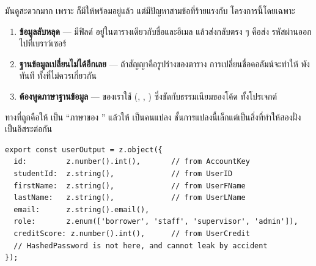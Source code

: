 \begin{badbox}[title={ห้าม \code{return} \en{Prisma model} ตรง ๆ ออกไปเป็น \en{output}}]
มันดูสะดวกมาก เพราะ  ก็มีให้พร้อมอยู่แล้ว แต่มีปัญหาสามข้อที่ร้ายแรงกับ
โครงการนี้โดยเฉพาะ

\begin{enumerate}
\item \textbf{ข้อมูลลับหลุด} ---  มีฟิลด์
       อยู่ในตารางเดียวกับชื่อและอีเมล 
      แล้วส่งกลับตรง ๆ คือส่ง  รหัสผ่านออกไปที่เบราว์เซอร์
\item \textbf{ฐานข้อมูลเปลี่ยนไม่ได้อีกเลย} --- ถ้าสัญญาคือรูปร่างของตาราง
      การเปลี่ยนชื่อคอลัมน์จะทำให้  พังทันที ทั้งที่ไม่ควรเกี่ยวกัน
\item \textbf{ ต้องพูดภาษาฐานข้อมูล} ---  ของเราใช้
       (, , )
      ซึ่งขัดกับธรรมเนียมของโค้ด  ทั้งโปรเจกต์
\end{enumerate}
\end{badbox}

ทางที่ถูกคือให้  เป็น ``ภาษาของ '' แล้วให้
 เป็นคนแปลง ชั้นการแปลงนี้เล็กแต่เป็นสิ่งที่ทำให้สองฝั่งเป็นอิสระต่อกัน

\begin{lstlisting}
export const userOutput = z.object({
  id:         z.number().int(),       // from AccountKey
  studentId:  z.string(),             // from UserID
  firstName:  z.string(),             // from UserFName
  lastName:   z.string(),             // from UserLName
  email:      z.string().email(),
  role:       z.enum(['borrower', 'staff', 'supervisor', 'admin']),
  creditScore: z.number().int(),      // from UserCredit
  // HashedPassword is not here, and cannot leak by accident
});
\end{lstlisting}

